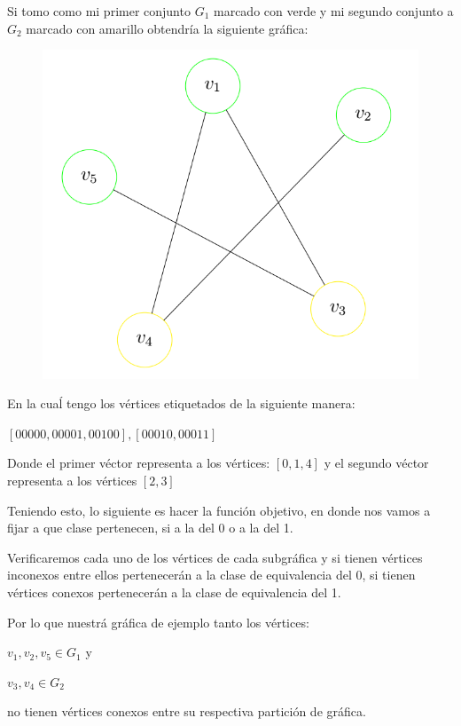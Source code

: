 \documentclass{article}
\begin{document}
Si tomo como mi primer conjunto $G_1$ marcado con verde y mi 
segundo conjunto a $G_2$ marcado con amarillo obtendría la 
siguiente gráfica:

\begin{figure}[h]
\begin{center}
\includegraphics[scale=0.25]{./img/biPartitionGraph}
\end{center}
\end{figure}
En la cuaĺ tengo los vértices etiquetados de la siguiente manera:

$[00000,00001,00100],[00010, 00011]$

Donde el primer véctor representa a los vértices: $[0,1,4]$ y el
segundo véctor representa a los vértices $[2,3]$

Teniendo esto, lo siguiente es hacer la función objetivo, en  donde 
nos vamos a fijar a que clase pertenecen, si a la del 0 o a la del 1.

Verificaremos cada uno de los vértices de cada subgráfica y si tienen
vértices inconexos entre ellos pertenecerán a la clase de 
equivalencia del 0, si tienen vértices conexos pertenecerán a la 
clase de equivalencia del 1.

Por lo que nuestrá gráfica de ejemplo tanto los vértices:

$v_1,v_2,v_5 \in G_1$ y

$v_3,v_4 \in G_2$

no tienen vértices conexos entre su respectiva partición de gráfica.
\end{document}
